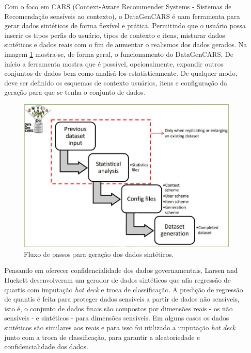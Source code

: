 \documentclass[
	12pt,				%
	openright,			%
	twoside,			%
	a4paper,			%
	english,			%
	brazil				%
	]{abntex2}
\begin{document}
		Com o foco em CARS (Context-Aware Recommender Systems - Sistemas de Recomendação sensíveis ao contexto), o DataGenCARS \cite{delCarmenRodrguezHernndez2017} é uam ferramenta para gerar dados sintéticos de forma flexível e prática.
		Permitindo que o usuário possa inserir os tipos perfis do usuário, tipos de contexto e itens, misturar dados sintéticos e dados reais com o fim de aumentar o realismos dos dados gerados.
		Na imagem \ref{fig:DataGenCARS} mostra-se, de forma geral, o funcionamento do DataGenCARS.
		De início a ferramenta mostra que é possível, opcionalmente, expandir outros conjuntos de dados bem como analisá-los estatisticamente.
		De qualquer modo, deve ser definido os esquemas de contexto usuários, itens e configuração da geração para que se tenha o conjunto de dados.
		\begin{figure}[h!]
			\centering
			\includegraphics[width=\linewidth]{./figures/TrabalhosRelacionados/DataGenCARS.jpg}
			\caption{Fluxo de passos para geração dos dados sintéticos.}
			\label{fig:DataGenCARS}
		\end{figure}

		Pensando em oferecer confidencialidade dos dados governamentais, Larsen and Huckett \cite{Larsen2012} desenvolveram um gerador de dados sintéticos que alia regressão de quartis com imputação \emph{hot deck} e troca de classificação.
		A predição de regressão de quantis é feita para proteger dados sensíveis a partir de dados não sensíveis,
		 isto é, o conjunto de dados finais são compostos por dimensões reais - os não sensíveis - e sintéticos - para dimensões sensíveis.
		Em alguns casos os dados sintéticos são similares aos reais e para isso foi utilizado a imputação \emph{hot deck} junto com a troca de classificação, para garantir a aleatoriedade e confidencialidade dos dados.
\end{document}
